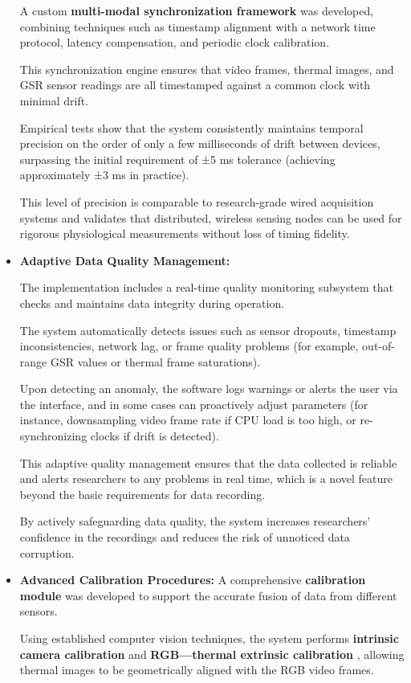 \begin{itemize}
A custom \textbf{multi-modal synchronization framework}
 was developed, combining techniques such as timestamp alignment with a network time protocol, latency compensation, and periodic clock calibration.

This synchronization engine ensures that video frames, thermal images, and GSR sensor readings are all timestamped against a common clock with minimal drift.

Empirical tests show that the system consistently maintains temporal precision on the order of only a few milliseconds of drift between devices, surpassing the initial requirement of ±5 ms tolerance (achieving approximately ±3 ms in practice).

This level of precision is comparable to research-grade wired acquisition systems and validates that distributed, wireless sensing nodes can be used for rigorous physiological measurements without loss of timing fidelity.

\item \textbf{Adaptive Data Quality Management:}

The implementation includes a real-time quality monitoring subsystem that checks and maintains data integrity during operation.

The system automatically detects issues such as sensor dropouts, timestamp inconsistencies, network lag, or frame quality problems (for example, out-of-range GSR values or thermal frame saturations).

Upon detecting an anomaly, the software logs warnings or alerts the user via the interface, and in some cases can proactively adjust parameters (for instance, downsampling video frame rate if CPU load is too high, or re-synchronizing clocks if drift is detected).

This adaptive quality management ensures that the data collected is reliable and alerts researchers to any problems in real time, which is a novel feature beyond the basic requirements for data recording.

By actively safeguarding data quality, the system increases researchers' confidence in the recordings and reduces the risk of unnoticed data corruption.

\item \textbf{Advanced Calibration Procedures:}
 A comprehensive \textbf{calibration module}
 was developed to support the accurate fusion of data from different sensors.

Using established computer vision techniques, the system performs \textbf{intrinsic camera calibration}
 and \textbf{RGB---thermal extrinsic calibration}
, allowing thermal images to be geometrically aligned with the RGB video frames.


\end{itemize}
